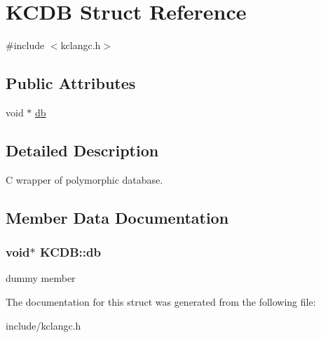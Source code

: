 \hypertarget{structKCDB}{\section{\-K\-C\-D\-B \-Struct \-Reference}
\label{structKCDB}
}


{\ttfamily \#include $<$kclangc.\-h$>$}

\subsection*{\-Public \-Attributes}
\begin{DoxyCompactItemize}
\item 
void $\ast$ \hyperlink{structKCDB_a8828faedd093c54920e201c03712c2e0}{db}
\end{DoxyCompactItemize}


\subsection{\-Detailed \-Description}
\-C wrapper of polymorphic database. 

\subsection{\-Member \-Data \-Documentation}
\hypertarget{structKCDB_a8828faedd093c54920e201c03712c2e0}{
\subsubsection[{db}]{\setlength{\rightskip}{0pt plus 5cm}void$\ast$ {\bf \-K\-C\-D\-B\-::db}}}\label{structKCDB_a8828faedd093c54920e201c03712c2e0}
dummy member 

\-The documentation for this struct was generated from the following file\-:\begin{DoxyCompactItemize}
\item 
include/kclangc.\-h\end{DoxyCompactItemize}
